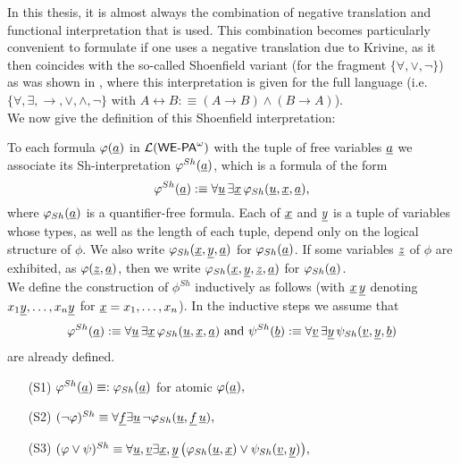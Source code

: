 In this thesis, it is almost always the combination of negative 
translation and functional interpretation that is used. This combination becomes 
particularly convenient to formulate if one uses a negative translation due 
to Krivine, as it then coincides with the so-called Shoenfield variant 
\cite{shoenfield01} (for the fragment $\{ \forall, \vee,\neg\}$) as 
was shown in \cite{streicherkohlenbach07}, where this interpretation is 
given for the full language (i.e. $\{ \forall, \exists, \rightarrow,\vee,
\wedge,\neg \}$ with $A\leftrightarrow B:\equiv 
(A\to B) \wedge (B\to A)$). 
\\[1mm]
We now give the definition of this Shoenfield interpretation:   
\begin{dfn} \label{d:FI}
To each formula $\varphi(\underline{a})$ in ${\mathcal L}({\textsf{\upshape WE-PA}}^{\omega})$ with the tuple of
free variables $\underline{a}$ we associate its {Sh-interpretation}
$\varphi^{Sh}(\underline{a})$, which is a formula of the form
\[
\varphi^{Sh}(\underline{a}):\equiv\forall \underline{u}\,\exists \underline{x}\, 
\varphi_{Sh}(\underline{u},\underline{x}, \underline{a})
\text{,}
\]
where $\varphi_{Sh}(\underline{a})$ is a quantifier-free formula.
Each of $\underline{x}$ and $\underline{y}$ is a tuple of variables whose
types, as well
as the length of each tuple, depend only on the logical structure of $\phi$. 
We also write $\varphi_{Sh}(\underline{x},\underline{y},\underline{a})$ for $\varphi_{Sh}(\underline{a})$. 
If some variables
$\underline z$ of $\phi$ are exhibited, as $\varphi(\underline z,\underline a)$, then we write
$\varphi_{Sh}(\underline x, \underline y, \underline z,\underline{a})$ for $\varphi_{Sh}(\underline{a})$.\\
We define the construction of $\phi^{Sh}$ inductively as follows 
(with $\underline{x}\,\underline{y}$ denoting $x_1\underline{y},\ldots,x_n\underline{y}$ for 
$\underline{x}=x_1,\ldots,x_n$). In the inductive steps we assume that 
\[
\phi^{Sh}(\tup{a}):\equiv\forall \tup{u}\,\exists \tup{x}\, 
\phi_{Sh}(\tup{u},\tup{x}, \tup{a}) \ 
\text{and} \ \psi^{Sh}(\tup{b}):\equiv\forall \tup{v}\,\exists \tup{y}\, 
\psi_{Sh}(\tup{v},\tup{y}, \tup{b})
\] are already defined. 
\begin{enumerate}
\item[(S1)] $\varphi^{Sh}(\underline{a}) 
\equiv:\varphi_{Sh}(\underline{a})$ for atomic 
$\varphi(\underline{a}),$
\item[(S2)] $(\neg \varphi)^{Sh} \equiv \forall \underline{f} \exists \underline{u} \, 
\neg \varphi_{Sh}(\underline{u},\underline{f}\,\underline{u}),$
\item[(S3)] $(\varphi \vee \psi)^{Sh} \equiv 
             \forall \underline{u},\underline{v} \exists \underline{x},\underline{y} \, 
\big(\varphi_{Sh}(\underline{u},\underline{x}) \vee \psi_{Sh}(\underline{v},\underline{y})\big),$

\end{enumerate}
\end{dfn}
